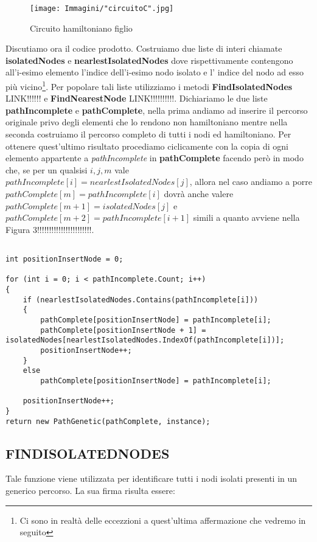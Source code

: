 \documentclass[11pt]{article}
\begin{document}
\begin{figure}[htbp]
    \centering
    \texttt{[image: Immagini/"circuitoC".jpg]}
    \caption{Circuito hamiltoniano figlio}
\end{figure}

Discutiamo ora il codice prodotto. Costruiamo due liste di interi chiamate \textbf{isolatedNodes} e \textbf{nearlestIsolatedNodes} dove rispettivamente contengono all'i-esimo elemento l'indice dell'i-esimo nodo isolato e l' indice del nodo ad esso più vicino\footnote{Ci sono in realtà delle eccezzioni a quest'ultima affermazione che vedremo in seguito}.
Per popolare tali liste utilizziamo i metodi \textbf{FindIsolatedNodes} LINK!!!!!! e \textbf{FindNearestNode} LINK!!!!!!!!!!.
Dichiariamo le due liste \textbf{pathIncomplete} e \textbf{pathComplete}, nella prima andiamo ad inserire il percorso originale privo degli elementi che lo rendono non hamiltoniano mentre nella seconda costruiamo il percorso completo di tutti i nodi ed hamiltoniano. Per ottenere quest'ultimo risultato procediamo ciclicamente con la copia di ogni elemento appartente a \textit{pathIncomplete} in \textbf{pathComplete} facendo però in modo che, se per un qualsisi $i, j, m$ vale $pathIncomplete[i]=nearlestIsolatedNodes[j]$, allora nel caso andiamo a porre $pathComplete[m]=pathIncomplete[i]$ dovrà anche valere $pathComplete[m+1]=isolatedNodes[j]$ e $pathComplete[m+2]=pathIncomplete[i+1]$ simili a quanto avviene nella Figura 3!!!!!!!!!!!!!!!!!!!!!!!.

\begin{lstlisting}

int positionInsertNode = 0;

for (int i = 0; i < pathIncomplete.Count; i++)
{
    if (nearlestIsolatedNodes.Contains(pathIncomplete[i]))
    {
        pathComplete[positionInsertNode] = pathIncomplete[i];
        pathComplete[positionInsertNode + 1] = isolatedNodes[nearlestIsolatedNodes.IndexOf(pathIncomplete[i])];
        positionInsertNode++;
    }
    else
        pathComplete[positionInsertNode] = pathIncomplete[i];

    positionInsertNode++;
}
return new PathGenetic(pathComplete, instance);
\end{lstlisting}

\subsection*{FINDISOLATEDNODES}
\label{sec:FindIsolatedNodesS}

Tale funzione viene utilizzata per identificare tutti i nodi isolati presenti in un generico percorso.
La sua firma risulta essere:
\end{document}
